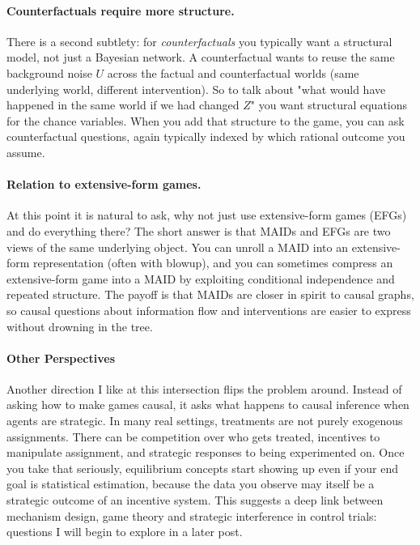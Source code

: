 \documentclass{article}
\begin{document}
\paragraph{Counterfactuals require more structure.}
There is a second subtlety: for \emph{counterfactuals} you typically want a structural model, not just a Bayesian network. A counterfactual wants to reuse the same background noise $U$ across the factual and counterfactual worlds (same underlying world, different intervention). So to talk about "what would have happened in the same world if we had changed $Z$" you want structural equations for the chance variables. When you add that structure to the game, you can ask counterfactual questions, again typically indexed by which rational outcome you assume.

\paragraph{Relation to extensive-form games.}
At this point it is natural to ask, why not just use extensive-form games (EFGs) and do everything there? The short answer is that MAIDs and EFGs are two views of the same underlying object. You can unroll a MAID into an extensive-form representation (often with blowup), and you can sometimes compress an extensive-form game into a MAID by exploiting conditional independence and repeated structure. The payoff is that MAIDs are closer in spirit to causal graphs, so causal questions about information flow and interventions are easier to express without drowning in the tree.

\paragraph{Other Perspectives}
Another direction I like at this intersection flips the problem around. Instead of asking how to make games causal, it asks what happens to causal inference when agents are strategic. In many real settings, treatments are not purely exogenous assignments. There can be competition over who gets treated, incentives to manipulate assignment, and strategic responses to being experimented on. Once you take that seriously, equilibrium concepts start showing up even if your end goal is statistical estimation, because the data you observe may itself be a strategic outcome of an incentive system. This suggests a deep link between mechanism design, game theory and strategic interference in control trials: questions I will begin to explore in a later post.
\end{document}
